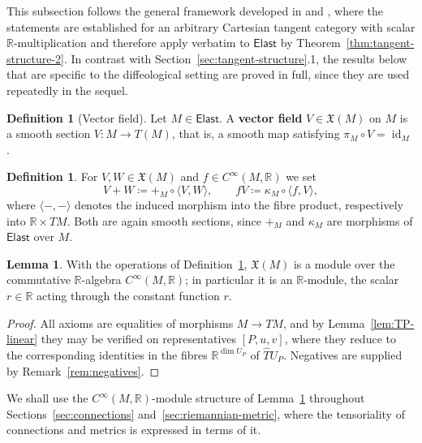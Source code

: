 \documentclass{amsart}
\newcommand{\R}{\mathbb{R}}
\DeclareMathOperator{\id}{id}
\theoremstyle{definition}
\newtheorem{defn}[thm]{Definition}
\newtheorem{lem}[thm]{Lemma}
\begin{document}
This subsection follows the general framework developed in
\cite[Sections~2.4, 2.6]{AB} and \cite[Section~A.1]{M}, where the statements
are established for an arbitrary Cartesian tangent category with scalar
$\R$-multiplication and therefore apply verbatim to $\mathsf{Elast}$ by
Theorem~\ref{thm:tangent-structure-2}. In contrast with
Section~\ref{sec:tangent-structure}.1, the results below that are specific to
the diffeological setting are proved in full, since they are used repeatedly in
the sequel.

\begin{defn}[Vector field]\label{def:vector-field}
Let $M \in \mathsf{Elast}$.
A \textbf{vector field} $V \in \mathfrak{X}(M)$ on $M$ is a smooth section
$V \colon M \to T(M)$, that is, a smooth map satisfying $\pi_M \circ V = \id_M$.
\end{defn}

\begin{defn}\label{def:vf-module}
For $V, W \in \mathfrak{X}(M)$ and $f \in C^\infty(M,\R)$ we set
\begin{equation*}
  V + W \coloneqq {+}_M \circ \langle V, W\rangle,
  \qquad
  fV \coloneqq \kappa_M \circ \langle f, V \rangle ,
\end{equation*}
where $\langle -,- \rangle$ denotes the induced morphism into the fibre
product, respectively into $\R \times TM$. Both are again smooth sections,
since $+_M$ and $\kappa_M$ are morphisms of $\mathsf{Elast}$ over $M$.
\end{defn}

\begin{lem}\label{lem:vf-module}
With the operations of Definition~\ref{def:vf-module}, $\mathfrak{X}(M)$ is a
module over the commutative $\R$-algebra $C^\infty(M,\R)$; in particular it is
an $\R$-module, the scalar $r \in \R$ acting through the constant function $r$.
\end{lem}

\begin{proof}
All axioms are equalities of morphisms $M \to TM$, and by
Lemma~\ref{lem:TP-linear} they may be verified on representatives $[P,u,v]$,
where they reduce to the corresponding identities in the fibres
$\R^{\dim U_P}$ of $\hat{T}U_P$. Negatives are supplied by
Remark~\ref{rem:negatives}.
\end{proof}

We shall use the $C^\infty(M,\R)$-module structure of
Lemma~\ref{lem:vf-module} throughout Sections~\ref{sec:connections}
and~\ref{sec:riemannian-metric}, where the tensoriality of connections and
metrics is expressed in terms of it.
\end{document}
